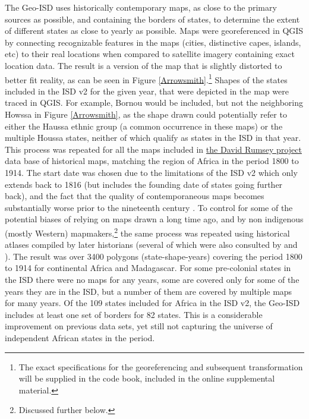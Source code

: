 \documentclass[12pt]{article}
\begin{document}
The Geo-ISD uses historically contemporary maps, as close to the primary sources
as possible, and containing the borders of states, to determine the extent of
different states as close to yearly as possible. Maps were georeferenced in QGIS
by connecting recognizable features in the maps (cities, distinctive capes,
islands, etc) to their real locations when compared to satellite imagery
containing exact location data. The result is a version of the map that is
slightly distorted to better fit reality, as can be seen in Figure
\ref{Arrowsmith}.\footnote{The exact specifications for the georeferencing and
subsequent transformation will be supplied in the code book, included in the
online supplemental material.} Shapes of the states included in the ISD v2 for
the given year, that were depicted in the map were traced in QGIS. For example,
Bornou would be included, but not the neighboring Howssa in Figure
\ref{Arrowsmith}, as the shape drawn could potentially refer to either the
Haussa ethnic group (a common occurrence in these maps) or the multiple Houssa
states, neither of which qualify as states in the ISD in that year. This process
was repeated for all the maps included in \href{https://www.davidrumsey.com}{the
David Rumsey project} data base of historical maps, matching the region of
Africa in the period 1800 to 1914. The start date was chosen due to the
limitations of the ISD v2 which only extends back to 1816 (but includes the
founding date of states going further back), and the fact that the quality of
contemporaneous maps becomes substantially worse prior to the nineteenth century
\citep{Bassett_1994}. To control for some of the potential biases of relying on
maps drawn a long time ago, and by non indigenous (mostly Western)
mapmakers,\footnote{Discussed further below.} the same process was repeated
using historical atlases compiled by later historians (several of which were
also consulted by \citet{Depetris-Chauvin2016} and \citet{Paine2019}). The
result was over 3400 polygons (state-shape-years) covering the period 1800 to
1914 for continental Africa and Madagascar. For some pre-colonial states in the
ISD there were no maps for any years, some are covered only for some of the
years they are in the ISD, but a number of them are covered by multiple maps for
many years. Of the 109 states included for Africa in the ISD v2, the Geo-ISD
includes at least one set of borders for 82 states. This is a considerable
improvement on previous data sets, yet still not capturing the universe of
independent African states in the period.
\end{document}
